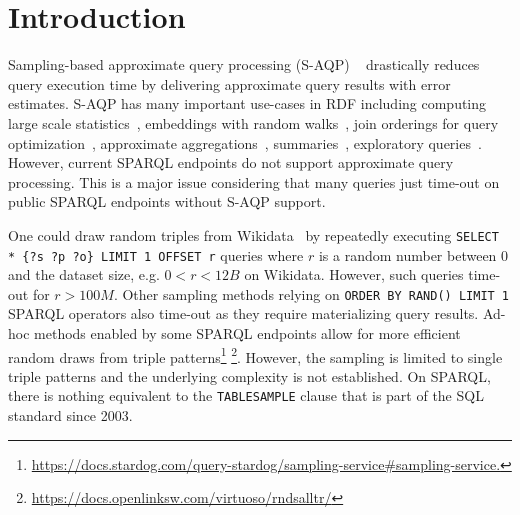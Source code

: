 
\section{Introduction}

Sampling-based approximate query processing (S-AQP)
~\cite{DBLP:conf/sigmod/AgarwalMKTJMMS14} drastically reduces query
execution time by delivering approximate query results with error
estimates. S-AQP has many important use-cases in RDF including
computing large scale
statistics~\cite{soulet2019anytime,10.1007/978-3-319-18818-8_14},
embeddings with random walks~\cite{ristoski2016rdf2vec}, join
orderings for query optimization~\cite{DBLP:conf/cidr/LeisRGK017},
approximate
aggregations~\cite{DBLP:journals/tods/LiWYZ19,wang2022approximate},
summaries~\cite{10.1007/978-3-030-49461-2_10}, exploratory
queries~\cite{DBLP:conf/sigmod/AgarwalMKTJMMS14}.
%
However, current SPARQL endpoints do not support approximate query
processing. This is a major issue considering that many queries just
time-out on public SPARQL endpoints without S-AQP support.

\noindent One could draw random triples from
Wikidata~\cite{soulet2019anytime} by repeatedly executing
\texttt{SELECT * \{?s ?p ?o\} LIMIT 1 OFFSET r} queries where $r$ is a random
number between $0$ and the dataset size, e.g. $0<r<12B$ on Wikidata. However, such queries
time-out for $r > 100M$. Other sampling methods relying
on \texttt{ORDER BY RAND() LIMIT 1} SPARQL operators also time-out as they require
materializing query results. Ad-hoc methods enabled by some SPARQL
endpoints allow for more efficient random draws from triple
patterns\footnote{\url{https://docs.stardog.com/query-stardog/sampling-service\#sampling-service.}}
\footnote{\url{https://docs.openlinksw.com/virtuoso/rndsalltr/}}.
However, the sampling is limited to single triple patterns and the
underlying complexity is not established.  On SPARQL, there is nothing
equivalent to the \texttt{TABLESAMPLE} clause that is part of the SQL
standard since 2003.


